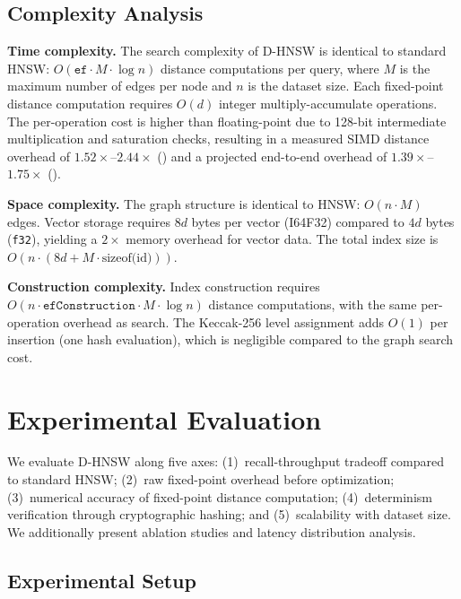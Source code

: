 \documentclass[10pt,journal]{IEEEtran}
\newcommand{\dhnsw}{\textsc{D-HNSW}}
\newcommand{\hnsw}{\textsc{HNSW}}
\begin{document}
\subsection{Complexity Analysis}

\textbf{Time complexity.} The search complexity of \dhnsw{} is identical to standard \hnsw{}: $O(\texttt{ef} \cdot M \cdot \log n)$ distance computations per query, where $M$ is the maximum number of edges per node and $n$ is the dataset size. Each fixed-point distance computation requires $O(d)$ integer multiply-accumulate operations. The per-operation cost is higher than floating-point due to 128-bit intermediate multiplication and saturation checks, resulting in a measured SIMD distance overhead of $1.52\times$--$2.44\times$ () and a projected end-to-end overhead of $1.39\times$--$1.75\times$ ().

\textbf{Space complexity.} The graph structure is identical to \hnsw{}: $O(n \cdot M)$ edges. Vector storage requires $8d$ bytes per vector (I64F32) compared to $4d$ bytes (\texttt{f32}), yielding a $2\times$ memory overhead for vector data. The total index size is $O(n \cdot (8d + M \cdot \text{sizeof(id)}))$.

\textbf{Construction complexity.} Index construction requires $O(n \cdot \texttt{efConstruction} \cdot M \cdot \log n)$ distance computations, with the same per-operation overhead as search. The Keccak-256 level assignment adds $O(1)$ per insertion (one hash evaluation), which is negligible compared to the graph search cost.


\section{Experimental Evaluation}
\label{sec:experiments}

We evaluate \dhnsw{} along five axes: (1)~recall-throughput tradeoff compared to standard \hnsw{}; (2)~raw fixed-point overhead before optimization; (3)~numerical accuracy of fixed-point distance computation; (4)~determinism verification through cryptographic hashing; and (5)~scalability with dataset size. We additionally present ablation studies and latency distribution analysis.

\subsection{Experimental Setup}
\end{document}
